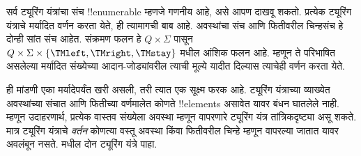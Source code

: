 \documentclass[../../../include/open-logic-section]{subfiles}
\begin{document}

\begin{explain}
सर्व ट्यूरिंग यंत्रांचा संच !!{enumerable} म्हणजे गणनीय
आहे, असे आपण दाखवू शकतो. प्रत्येक ट्यूरिंग यंत्राचे
मर्यादित वर्णन करता येते, ही त्यामागची बाब आहे. अवस्थांचा
संच आणि फितीवरील चिन्हसंच हे दोन्ही सांत संच आहेत.
संक्रमण फलन हे $Q \times \Sigma$ पासून
$Q \times \Sigma \times \{\TMleft, \TMright, \TMstay\}$
मधील आंशिक फलन आहे. म्हणून ते परिभाषित असलेल्या
मर्यादित संख्येच्या आदान-जोड्यांवरील त्याची मूल्ये
यादीत दिल्यास त्याचेही वर्णन करता येते.

ही मांडणी एका मर्यादेपर्यंत खरी असली, तरी त्यात
एक सूक्ष्म फरक आहे. ट्यूरिंग यंत्राच्या व्याख्येत
अवस्थांच्या संचात आणि फितीच्या वर्णमालेत कोणते
!!{element}s असावेत यावर बंधन घातलेले नाही.
म्हणून उदाहरणार्थ, प्रत्येक वास्तव संख्येला अवस्था
म्हणून वापरणारे ट्यूरिंग यंत्र तांत्रिकदृष्ट्या
असू शकते. मात्र ट्यूरिंग यंत्राचे \emph{वर्तन}
कोणत्या वस्तू अवस्था किंवा फितीवरील चिन्हे म्हणून
वापरल्या जातात यावर अवलंबून नसते.
 मधील दोन ट्यूरिंग यंत्रे पाहा.
\begin{figure}
\begin{center}
\\
\end{center}
\end{figure}
\end{explain}
\end{document}
